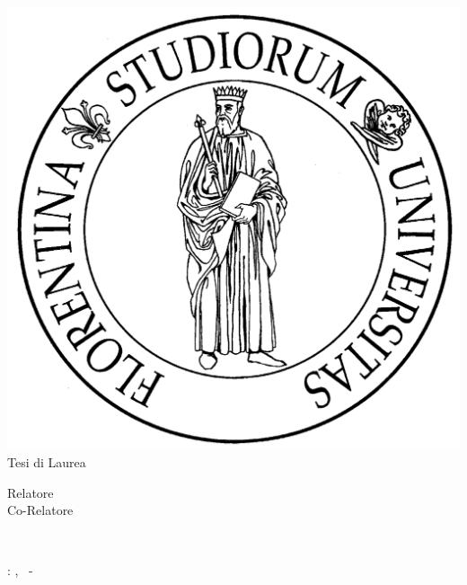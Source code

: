 \begin{titlepage}
	\begin{center}
   	\large
      \hfill
      \vfill
      \begingroup
			\spacedallcaps{\myUni} \\ 
			\myFaculty \\
			\myDegree \\ 
			\vspace{0.5cm}
         \includegraphics[scale=.065]{logo/unifi}\\
         \vspace{0.5cm}    
         Tesi di Laurea    
      \endgroup 
      \vfill 
      \begingroup
      	\color{RoyalBlue}\spacedallcaps{\myTitle} \\ \bigskip
      \endgroup
      \spacedlowsmallcaps{\myName}
      \vfill        
			\begin{flushleft}
			\hspace{2.5cm} Relatore \hspace{.6cm}\textit{\myProf}\\ 
			      \vspace{0.3cm}
			\hspace{2.6cm}Co-Relatore\hspace{.3cm}\textit{\myOtherProf}\\
			\end{flushleft}
      \vfill
      \myTime\\
      \hspace{.5cm}
      \myVersion
      \vfill                      
	\end{center}        
\end{titlepage}   
   \newpage
	\thispagestyle{empty}
	\hfill
	\vfill
	\noindent\myName: 
	\textit{\myEngTitle}, 
	\myDegree \textcopyright\ \myTime-\myShortVersion


